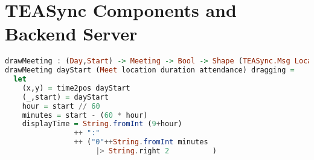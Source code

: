 
\chapter{TEASync Components and Backend Server}
\label{appendix:A}
\vspace{4pt}
\begin{lstlisting}[language=Haskell, caption=Defining a Event component in TEASync Calendar Application, label=lst:java]
drawMeeting : (Day,Start) -> Meeting -> Bool -> Shape (TEASync.Msg LocalMsg GlobalMsg GlobalModel)
drawMeeting dayStart (Meet location duration attendance) dragging =
  let
    (x,y) = time2pos dayStart
    (_,start) = dayStart
    hour = start // 60
    minutes = start - (60 * hour)
    displayTime = String.fromInt (9+hour) 
                ++ ":" 
                ++ ("0"++String.fromInt minutes 
                     |> String.right 2          )
    

\end{lstlisting}
